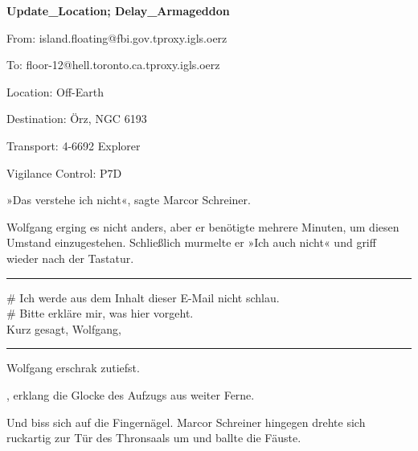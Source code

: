 \begin{itshape}

\textbf{Update\_Location; Delay\_Armageddon}

From: island.floating@fbi.gov.tproxy.igls.oerz

To: floor-12@hell.toronto.ca.tproxy.igls.oerz

Location: Off-Earth

Destination: Örz, NGC 6193

Transport: 4-6692 Explorer

Vigilance Control: P7D

\end{itshape}

»Das verstehe ich nicht«, sagte Marcor Schreiner.

Wolfgang erging es nicht anders, aber er benötigte mehrere Minuten, um diesen Umstand einzugestehen. Schließlich murmelte er »Ich auch nicht« und griff wieder nach der Tastatur.

\noindent \parbox{\textwidth}{ \vspace{3ex} \hrule \vspace{3ex}

    \begin{tiny}
    \begin{ttfamily}

\noindent \# Ich werde aus dem Inhalt dieser E-Mail nicht schlau.\\
\noindent \# Bitte erkläre mir, was hier vorgeht.\\
\noindent Kurz gesagt, Wolfgang,

    \end{ttfamily}
    \end{tiny}

\vspace{3ex} \hrule \vspace{3ex} }

Wolfgang erschrak zutiefst.

, erklang die Glocke des Aufzugs aus weiter Ferne.

Und biss sich auf die Fingernägel. Marcor Schreiner hingegen drehte sich ruckartig zur Tür des Thronsaals um und ballte die Fäuste.


